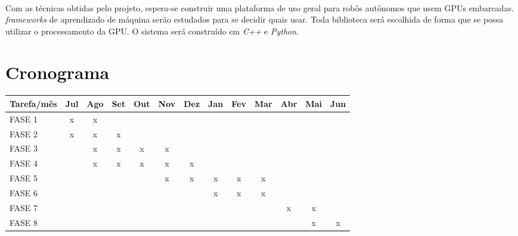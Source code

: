 \documentclass[11pt]{article}
\newcommand{\tit}[1]{\textit{#1}}
\begin{document}
\paragraph{}
Com as técnicas obtidas pelo projeto, espera-se construir uma plataforma
de uso geral para robôs autônomos que usem GPUs embarcadas.
\tit{frameworks} de aprendizado de máquina serão estudados para se decidir
quais usar. 
Toda biblioteca será escolhida de forma que se possa utilizar o processamento
da GPU. O sistema será construído em \tit{C++} e \tit{Python}.


\section{Cronograma}
\paragraph{}
\begin{table}[H]
\centering
\setlength{\tabcolsep}{.16667em}
\begin{tabular}{|C{3cm}|c|c|c|c|c|c|c|c|c|c|c|c|}
	\hline
	Tarefa/mês & Jul & Ago & Set & Out & Nov & Dez & Jan & Fev & Mar & Abr & Mai & 
	Jun \\
	\hline
	FASE 1 & x & x & & & & & & & & & &\\
	\hline
	FASE 2 & x & x & x & & & & & & & & & \\
	\hline
	FASE 3 & & x & x & x & x & & & & & & &  \\
	\hline
	FASE 4 & & x & x & x & x & x & & & & & &  \\
	\hline
	FASE 5 & & & & & x & x & x & x & x & & & \\
	\hline
	FASE 6 & & & & & & & x & x & x & & & \\
	\hline
	FASE 7 & & & & & & & & & & x & x & \\
	\hline
	FASE 8 & & & & & & & & & & & x & x \\
	\hline
\end{tabular}
\end{table}

\printbibliography
\end{document}
